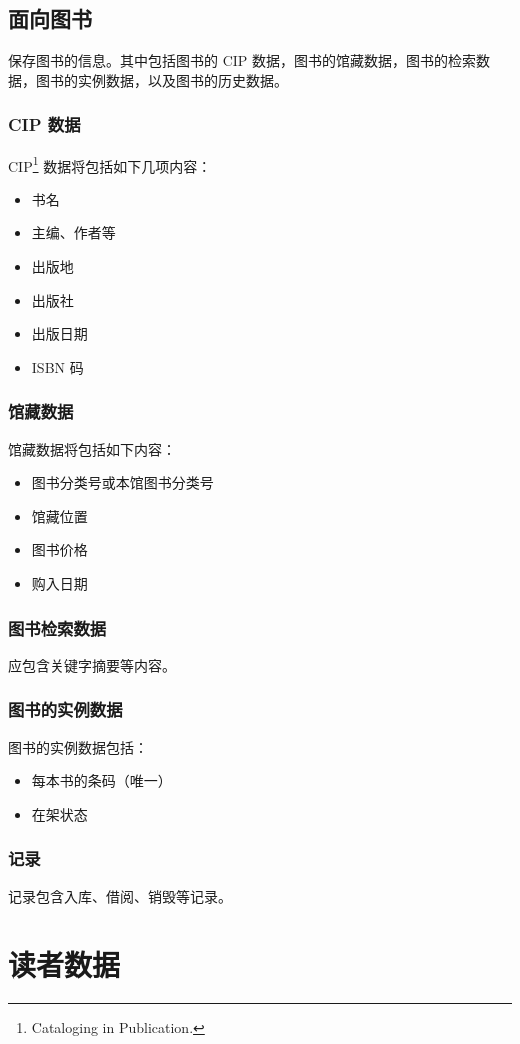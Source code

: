 \documentclass[UTF8]{ctexrep}
\begin{document}
    \section{面向图书}
    保存图书的信息。其中包括图书的 CIP 数据，图书的馆藏数据，图书的检索数据，图书的实例数据，以及图书的历史数据。
    \subsection{CIP 数据}
    CIP\footnote{Cataloging in Publication.}  数据将包括如下几项内容：
    \begin{itemize}
    	\item 书名
    	\item 主编、作者等
    	\item 出版地
    	\item 出版社
    	\item 出版日期
    	\item ISBN 码
    \end{itemize}
    \subsection{馆藏数据}
    馆藏数据将包括如下内容：
    \begin{itemize}
    	\item 图书分类号或本馆图书分类号
    	\item 馆藏位置
    	\item 图书价格
    	\item 购入日期
    \end{itemize}
    \subsection{图书检索数据}
    应包含关键字摘要等内容。
    \subsection{图书的实例数据}
    图书的实例数据包括：
    \begin{itemize}
    	\item 每本书的条码（唯一）
    	\item 在架状态
    \end{itemize}
    \subsection{记录}
    记录包含入库、借阅、销毁等记录。
    \chapter{读者数据}
\end{document}
